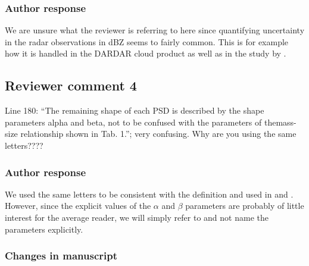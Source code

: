 \subsubsection*{Author response}

We are unsure what the reviewer is referring to here since quantifying
uncertainty in the radar observations in dBZ seems to fairly common. This is for
example how it is handled in the DARDAR cloud \citep{delanoe10} product as well
as in the study by \citet{jiang19}.

\subsection*{Reviewer comment 4}

Line 180: “The remaining shape of each PSD is described by the shape parameters
alpha and beta, not to be confused with the parameters of themass-size
relationship shown in Tab. 1.”; very confusing. Why are you using the
same letters????

\subsubsection*{Author response}

We used the same letters to be consistent with the definition and used in
\cite{delanoe14} and \cite{cazenave18}. However, since the explicit values of
the $\alpha$ and $\beta$ parameters are probably of little interest for the
average reader, we will simply refer to \cite{cazenave18} and not name the
parameters explicitly.

\subsubsection*{Changes in manuscript}

